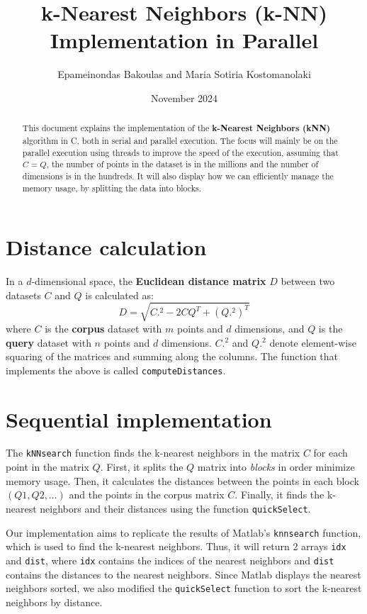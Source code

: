 \documentclass{article}
\title{k-Nearest Neighbors (k-NN) Implementation in Parallel}
\author{Epameinondas Bakoulas and Maria Sotiria Kostomanolaki}
\date{November 2024}
\begin{document}
\maketitle

\begin{abstract}
    This document explains the implementation of the \textbf{k-Nearest Neighbors (kNN)} algorithm in C, both in serial and parallel execution.
    The focus will mainly be on the parallel execution using threads to improve the speed of the execution, assuming that $C=Q$, the
    number of points in the dataset is in the millions and the number of dimensions is in the hundreds. It will also display how
    we can efficiently manage the memory usage, by splitting the data into blocks.
\end{abstract}

\section{Distance calculation}
In a $d$-dimensional space, the \textbf{Euclidean distance matrix} $D$ between two datasets 
$C$ and $Q$ is calculated as: 
\[
D = \sqrt{C.^2 - 2 C Q^T + (Q.^2)^T}
\]
where $C$ is the \textbf{corpus} dataset with $m$ points and $d$ dimensions, and $Q$ is the \textbf{query} dataset with $n$ points and $d$ dimensions.
$C.^2$ and $Q.^2$ denote element-wise squaring of the matrices and summing along the columns.
The function that implements the above is called \texttt{computeDistances}.

\section{Sequential implementation}
The \texttt{kNNsearch} function finds the k-nearest neighbors in the matrix $C$ for each point in the matrix $Q$.
First, it splits the $Q$ matrix into \emph{blocks} in order minimize memory usage.
Then, it calculates the distances between the points in each block $(Q1, Q2, \dots)$ and the points in the corpus matrix $C$.
Finally, it finds the k-nearest neighbors and their distances using the function \texttt{quickSelect}.

Our implementation aims to replicate the results of Matlab's \texttt{knnsearch} function, which is used to find the k-nearest neighbors.
Thus, it will return 2 arrays \texttt{idx} and \texttt{dist}, where \texttt{idx} contains the indices of the nearest neighbors
and \texttt{dist} contains the distances to the nearest neighbors.
Since Matlab displays the nearest neighbors sorted, we also modified the \texttt{quickSelect} function to sort the k-nearest 
neighbors by distance.
\end{document}
